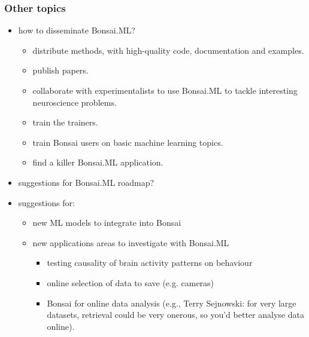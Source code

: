 \begin{frame}
    \frametitle{Other topics}

    \begin{itemize}

        \item how to disseminate Bonsai.ML?
            \begin{itemize}

                \item distribute methods, with high-quality code,
                    documentation and examples.

                \item publish papers.

                \item collaborate with experimentalists to use Bonsai.ML
                    to tackle interesting neuroscience problems.

                \item train the trainers.

                \item train Bonsai users on basic machine learning topics.

                \item find a killer Bonsai.ML application.

            \end{itemize}

        \item suggestions for Bonsai.ML roadmap?

        \item suggestions for:

            \begin{itemize}
                \item new ML models to integrate into Bonsai
                \item new applications areas to investigate with Bonsai.ML

                    \begin{itemize}

                        \item testing causality of brain activity patterns on
                            behaviour

                        \item online selection of data to save (e.g. cameras)

                        \item Bonsai for online data analysis (e.g., Terry
                            Sejnowski: for very large datasets, retrieval could
                            be very onerous, so you'd better analyse data
                            online).
                    \end{itemize}

            \end{itemize}

    \end{itemize}

\end{frame}

